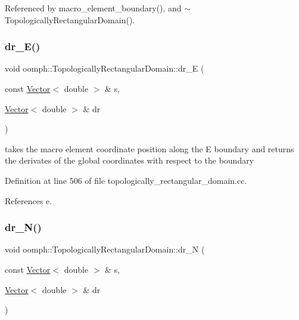 Referenced by macro\+\_\+element\+\_\+boundary(), and $\sim$\+Topologically\+Rectangular\+Domain().

\mbox{\label{classoomph_1_1TopologicallyRectangularDomain_a22b9364ef22563bea32aad2ff9e6851f}} 
\subsubsection{\texorpdfstring{dr\+\_\+\+E()}{dr\_E()}}
{\footnotesize\ttfamily void oomph\+::\+Topologically\+Rectangular\+Domain\+::dr\+\_\+E (\begin{DoxyParamCaption}\item[{const \hyperlink{classoomph_1_1Vector}{Vector}$<$ double $>$ \&}]{s,  }\item[{\hyperlink{classoomph_1_1Vector}{Vector}$<$ double $>$ \&}]{dr }\end{DoxyParamCaption})\hspace{0.3cm}{\ttfamily [private]}}



takes the macro element coordinate position along the E boundary and returns the derivates of the global coordinates with respect to the boundary 



Definition at line 506 of file topologically\+\_\+rectangular\+\_\+domain.\+cc.



References e.

\mbox{\label{classoomph_1_1TopologicallyRectangularDomain_ad37cd9d2ee8eb90125d66be63d5b97c7}} 
\subsubsection{\texorpdfstring{dr\+\_\+\+N()}{dr\_N()}}
{\footnotesize\ttfamily void oomph\+::\+Topologically\+Rectangular\+Domain\+::dr\+\_\+N (\begin{DoxyParamCaption}\item[{const \hyperlink{classoomph_1_1Vector}{Vector}$<$ double $>$ \&}]{s,  }\item[{\hyperlink{classoomph_1_1Vector}{Vector}$<$ double $>$ \&}]{dr }\end{DoxyParamCaption})\hspace{0.3cm}{\ttfamily [private]}}




